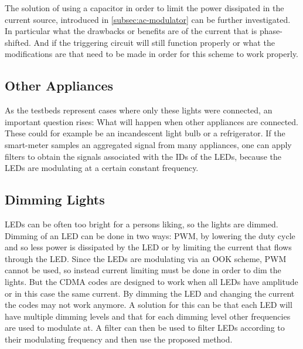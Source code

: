 	The solution of using a capacitor in order to limit the power dissipated in the current source, introduced in \autoref{subsec:ac-modulator} can be further investigated.
	In particular what the drawbacks or benefits are of the current that is phase-shifted.
	And if the triggering circuit will still function properly or what the modifications are that need to be made in order for this scheme to work properly.


	\subsection{Other Appliances}

	As the testbeds represent cases where only these lights were connected, an important question rises: What will happen when other appliances are connected.
	These could for example be an incandescent light bulb or a refrigerator.
	If the smart-meter samples an aggregated signal from many appliances, one can apply filters to obtain the signals associated with the IDs of the LEDs, because the LEDs are modulating at a certain constant frequency.



	\subsection{Dimming Lights}

	LEDs can be often too bright for a persons liking, so the lights are dimmed.
	Dimming of an LED can be done in two ways: PWM, by lowering the duty cycle and so less power is dissipated by the LED or by limiting the current that flows through the LED.
	Since the LEDs are modulating via an OOK scheme, PWM cannot be used, so instead current limiting must be done in order to dim the lights.
	But the CDMA codes are designed to work when all LEDs have amplitude or in this case the same current.
	By dimming the LED and changing the current the codes may not work anymore.
	A solution for this can be that each LED will have multiple dimming levels and that for each dimming level other frequencies are used to modulate at.
	A filter can then be used to filter LEDs according to their modulating frequency and then use the proposed method.



